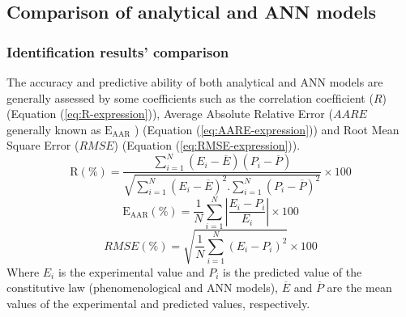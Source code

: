 \documentclass[twoside,english,1p,final,sort&compress]{elsarticle}
\theoremstyle{plain}
\newcommand{\AARE}{\text{E}_\text{AAR}}
\newcommand{\R}{\text{R}}
\begin{document}
\subsection{Comparison of analytical and ANN models\label{sec:Comparison}}
\subsubsection{Identification results' comparison \label{sec:Interpolation}}
The accuracy and predictive ability of both analytical and ANN models are generally assessed by some coefficients such as the correlation coefﬁcient ($R$) (Equation (\ref{eq:R-expression})), Average Absolute Relative Error ($AARE$ generally known as $\AARE$ ) (Equation (\ref{eq:AARE-expression})) and Root Mean Square Error ($RMSE$) (Equation (\ref{eq:RMSE-expression})).
\begin{equation}
\label{eq:R-expression}
\R(\%) = \frac{\displaystyle\sum_{i=1}^{N}{\left(E_i - \overline{E}\right)\left(P_i - \overline{P}\right)}}{\sqrt{\displaystyle\sum_{i=1}^{N}\left(E_i - \overline{E}\right)^2 .\displaystyle\sum_{i=1}^{N}\left(P_i - \overline{P}\right)^2}}\times 100
\end{equation}
\begin{equation}
\label{eq:AARE-expression}
\AARE(\%) = \frac{1}{N}\displaystyle\sum_{i=1}^{N} \displaystyle\left\lvert\frac{E_i- P_i}{E_i} \right\rvert\times 100
\end{equation}
\begin{equation}
\label{eq:RMSE-expression}
RMSE (\%) = \sqrt{\frac{1}{N} \displaystyle\sum_{i=1}^{N} \left(E_i - P_i\right)^2} \times 100
\end{equation}
Where $E_i$ is the experimental value and $P_i$ is the predicted value of the constitutive law (phenomenological and ANN models), $\overline{E}$ and $\overline{P}$ are the mean values of the experimental and predicted values, respectively.
\end{document}
